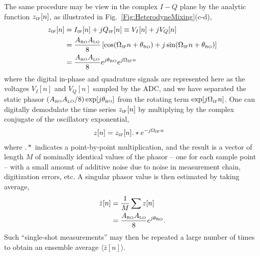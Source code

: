 \documentclass[aip,apr,twocolumn,showpacs,superscriptaddress,groupedaddress,nofootinbib,reprint]{revtex4-1}  %
\begin{document}
The same procedure may be view in the complex $I-Q$ plane by the analytic function $z_{\mbox{\tiny{IF}}}[n]$, as illustrated in Fig.~\ref{Fig:HeterodyneMixing}(c-d),
\begin{align}
    z_{\mbox{\tiny{IF}}}[n] &= I_{\mbox{\tiny{IF}}}[n]  + j Q_{\mbox{\tiny{IF}}}[n] \equiv V_{I}[n] + j V_Q[n] \\
         &= \frac{A_{\mbox{\tiny{RO}}}A_{\mbox{\tiny{LO}}}}{8}
            \left[ \cos (\Omega_{\mbox{\tiny{IF}}}n + \theta_{\mbox{\tiny{RO}}}) +  j \sin (\Omega_{\mbox{\tiny{IF}}}n + \theta_{\mbox{\tiny{RO}}}) \right] \\
         &= \frac{A_{\mbox{\tiny{RO}}}A_{\mbox{\tiny{LO}}}}{8} e^{j\theta_{\mbox{\tiny{RO}}}} e^{j\Omega_{\mbox{\tiny{IF}}}n}
\end{align}
where the digital in-phase and quadrature signals are represented here as the voltages $V_{I}[n]$ and $V_Q[n]$ sampled by the ADC, and we have separated the static phasor $(A_{\mbox{\tiny{RO}}}A_{\mbox{\tiny{LO}}}/8) \exp[j\theta_{\mbox{\tiny{RO}}}]$ from the rotating term $\exp[j\Omega_{\mbox{\tiny{IF}}}n]$. One can digitally demodulate the  time series $z_{\mbox{\tiny{IF}}}[n]$ by multiplying by the complex conjugate of the oscillatory exponential,
\begin{align}
    z[n] &= z_{\mbox{\tiny{IF}}}[n].*e^{-j\Omega_{\mbox{\tiny{IF}}}n} %
\end{align}
where $.*$ indicates a point-by-point multiplication, and the result is a vector of length $M$ of nominally identical values of the phasor -- one for each sample point -- with a small amount of additive noise due to noise in measurement chain, digitization errors, etc. A singular phasor value is then estimated by taking average,
\begin{align}
    \bar{z}[n] &= \frac{1}{M} \sum z[n]  \\
         &= \frac{A_{\mbox{\tiny{RO}}}A_{\mbox{\tiny{LO}}}}{8} e^{j\theta_{\mbox{\tiny{RO}}}}.
\end{align}
Such ``single-shot measurements'' may then be repeated a large number of times to obtain an ensemble average $\langle \bar{z}[n] \rangle$.
\end{document}
